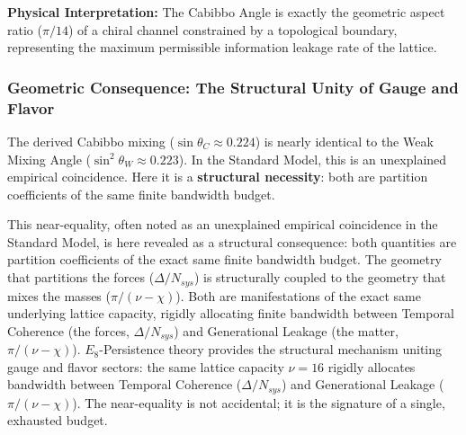 \noindent \textbf{Physical Interpretation:} The Cabibbo Angle is exactly the geometric aspect ratio ($\pi/14$) of a chiral channel constrained by a topological boundary, representing the maximum permissible information leakage rate of the lattice.

\subsubsection{Geometric Consequence: The Structural Unity of Gauge and Flavor}

The derived Cabibbo mixing ($\sin \theta_C \approx 0.224$) is nearly identical to the Weak Mixing Angle ($\sin^2 \theta_W \approx 0.223$). In the Standard Model, this is an unexplained empirical coincidence. Here it is a \textbf{structural necessity}: both are partition coefficients of the same finite bandwidth budget.

This near-equality, often noted as an unexplained empirical coincidence in the Standard Model, is here revealed as a structural consequence: both quantities are partition coefficients of the exact same finite bandwidth budget. The geometry that partitions the forces ($\Delta/N_{sys}$) is structurally coupled to the geometry that mixes the masses ($\pi/(\nu-\chi)$). Both are manifestations of the exact same underlying lattice capacity, rigidly allocating finite bandwidth between Temporal Coherence (the forces, $\Delta/N_{sys}$) and Generational Leakage (the matter, $\pi/(\nu-\chi)$). $E_8$-Persistence theory provides the structural mechanism uniting gauge and flavor sectors: the same lattice capacity $\nu=16$ rigidly allocates bandwidth between Temporal Coherence ($\Delta/N_{sys}$) and Generational Leakage ($\pi/(\nu-\chi)$). The near-equality is not accidental; it is the signature of a single, exhausted budget.